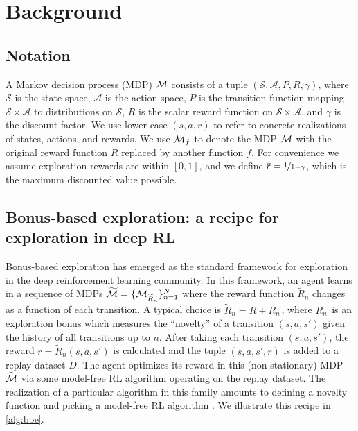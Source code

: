 \section{Background}

\subsection{Notation}

A Markov decision process (MDP) $\mathcal{M}$ consists of a tuple $(\mathcal{S}, \mathcal{A}, P, R, \gamma)$, where $\mathcal{S}$ is the state space, $\mathcal{A}$ is the action space, $P$ is the transition function mapping $\mathcal{S} \times \mathcal{A}$ to distributions on $\mathcal{S}$, $R$ is the scalar reward function on $\mathcal{S} \times \mathcal{A}$, and $\gamma$ is the discount factor.
We use lower-case $(s, a, r)$ to refer to concrete realizations of states, actions, and rewards.
We use $\mathcal{M}_f$ to denote the MDP $\mathcal{M}$ with the original reward function $R$ replaced by another function $f$.
For convenience we assume exploration rewards are within $[0, 1]$, and we define $\bar{r} = \nicefrac{1}{1 - \gamma}$, which is the maximum discounted value possible.


\subsection{Bonus-based exploration: a recipe for exploration in deep RL} \label{sec:intrinsic_rewards}

Bonus-based exploration has emerged as the standard framework for exploration in the deep reinforcement learning community.
In this framework, an agent learns in a sequence of MDPs $\widetilde{\mathcal{M}} = \{\mathcal{M}_{\widetilde{R}_n} \}_{n=1}^N$ where the reward function $\widetilde{R}_n$ changes as a function of each transition.
A typical choice is $\widetilde{R}_n = R + R^+_n$, where $R^+_n$ is an exploration bonus which measures the ``novelty'' of a transition $(s, a, s')$ given the history of all transitions up to $n$.
After taking each transition $(s, a, s')$, the reward $\widetilde{r} = \widetilde{R}_n(s, a, s')$ is calculated and the tuple $(s, a, s', \widetilde{r})$ is added to a replay dataset $D$.
The agent optimizes its reward in this (non-stationary) MDP $\widetilde{\mathcal{M}}$ via some model-free RL algorithm operating on the replay dataset.
The realization of a particular algorithm in this family amounts to defining a novelty function and picking a model-free RL algorithm \citep{Stadie2015IncentivizingEI,houthooft2016vime,bellemare2016unifying,pathak2017curiosity,Tang2017Exploration,burda2018exploration,Machado2020CountBasedEW}.
We illustrate this recipe in \cref{alg:bbe}.


